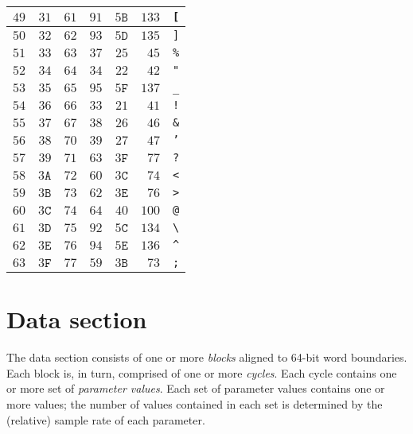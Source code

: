 \documentclass{report}
\begin{document}
\begin{table}[H]
\begin{tabular}{|rrr|rrrl|}
\( 49\) & \( 31\) & \( 61\) & \( 91\) & \( 5\mathtt{B}\) & \(133\) & \texttt{[} \\ \hline
\( 50\) & \( 32\) & \( 62\) & \( 93\) & \( 5\mathtt{D}\) & \(135\) & \texttt{]} \\ \hline
\( 51\) & \( 33\) & \( 63\) & \( 37\) & \( 25\) & \( 45\) & \texttt{\%} \\ \hline
\( 52\) & \( 34\) & \( 64\) & \( 34\) & \( 22\) & \( 42\) & \texttt{"} \\ \hline
\( 53\) & \( 35\) & \( 65\) & \( 95\) & \( 5\mathtt{F}\) & \(137\) & \texttt{\_} \\ \hline
\( 54\) & \( 36\) & \( 66\) & \( 33\) & \( 21\) & \( 41\) & \texttt{!} \\ \hline
\( 55\) & \( 37\) & \( 67\) & \( 38\) & \( 26\) & \( 46\) & \texttt{\&} \\ \hline
\( 56\) & \( 38\) & \( 70\) & \( 39\) & \( 27\) & \( 47\) & \texttt{'} \\ \hline
\( 57\) & \( 39\) & \( 71\) & \( 63\) & \( 3\mathtt{F}\) & \( 77\) & \texttt{?} \\ \hline
\( 58\) & \( 3\mathtt{A}\) & \( 72\) & \( 60\) & \( 3\mathtt{C}\) & \( 74\) & \texttt{<} \\ \hline
\( 59\) & \( 3\mathtt{B}\) & \( 73\) & \( 62\) & \( 3\mathtt{E}\) & \( 76\) & \texttt{>} \\ \hline
\( 60\) & \( 3\mathtt{C}\) & \( 74\) & \( 64\) & \( 40\) & \(100\) & \texttt{@} \\ \hline
\( 61\) & \( 3\mathtt{D}\) & \( 75\) & \( 92\) & \( 5\mathtt{C}\) & \(134\) & \texttt{\textbackslash} \\ \hline
\( 62\) & \( 3\mathtt{E}\) & \( 76\) & \( 94\) & \( 5\mathtt{E}\) & \(136\) & \texttt{\^} \\ \hline
\( 63\) & \( 3\mathtt{F}\) & \( 77\) & \( 59\) & \( 3\mathtt{B}\) & \( 73\) & \texttt{;} \\ \hline
\end{tabular}
\end{table}

\section{Data section}

The data section consists of one or more \textit{blocks} aligned to 64-bit word boundaries. Each block is, in turn, comprised of one or more \textit{cycles}. Each cycle contains one or more set of \textit{parameter values}. Each set of parameter values contains one or more values; the number of values contained in each set is determined by the (relative) sample rate of each parameter.
\end{document}
